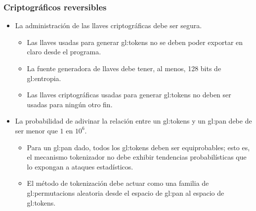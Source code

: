 %
%

\subsubsection{Criptográficos reversibles}

\begin{itemize}

  \item La administración de las llaves criptográficas debe ser segura.

  \begin{itemize}

    \item Las llaves usadas para generar \glspl{gl:token} no se deben poder
      exportar en claro desde el programa.

    \item La fuente generadora de llaves debe tener, al menos, 128 bits de
      \gls{gl:entropia}.

    \item Las llaves criptográficas usadas para generar \glspl{gl:token} no
      deben ser usadas para ningún otro fin.

  \end{itemize}

  \item La probabilidad de adivinar la relación entre un \glspl{gl:token} y un
    \gls{gl:pan} debe de ser menor que $ 1 $ en $ 10^6 $.

  \begin{itemize}

    \item Para un \gls{gl:pan} dado, todos los \glspl{gl:token} deben ser
      equiprobables; esto es, el mecanismo tokenizador no debe exhibir
      tendencias probabilísticas que lo expongan a ataques estadísticos.

    \item El método de tokenización debe actuar como una familia de
      \glspl{gl:permutacion} aleatoria desde el espacio de \gls{gl:pan} al
      espacio de \glspl{gl:token}.


\end{itemize}
\end{itemize}

